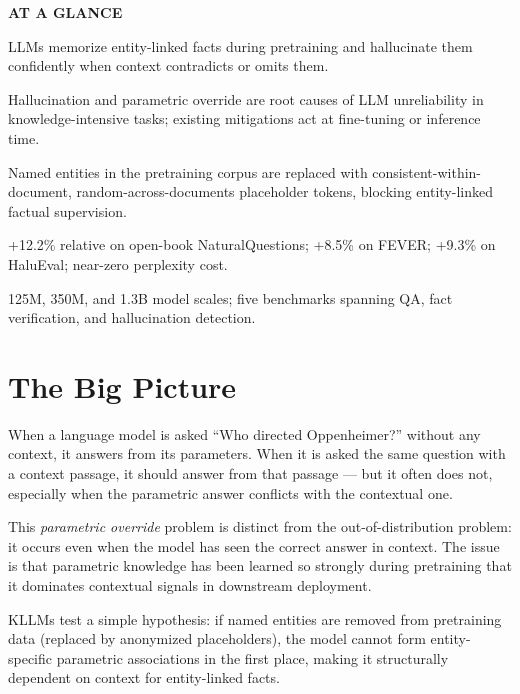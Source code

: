 \documentclass[10pt,twocolumn]{article}
\begin{document}
\begin{mdframed}[backgroundcolor=boxgray,linecolor=rulered,linewidth=1pt,
    innerleftmargin=6pt,innerrightmargin=6pt,
    innertopmargin=6pt,innerbottommargin=6pt]
\textbf{\small AT A GLANCE}\par\vspace{4pt}
\begin{description}[leftmargin=0pt,labelsep=4pt,itemsep=2pt,parsep=0pt,
    font=\small\bfseries]
  \item[Problem:] LLMs memorize entity-linked facts during pretraining
    and hallucinate them confidently when context contradicts or
    omits them.
  \item[Why it matters:] Hallucination and parametric override are
    root causes of LLM unreliability in knowledge-intensive tasks;
    existing mitigations act at fine-tuning or inference time.
  \item[Method:] Named entities in the pretraining corpus are replaced
    with consistent-within-document, random-across-documents
    placeholder tokens, blocking entity-linked factual supervision.
  \item[Result:] +12.2\% relative on open-book NaturalQuestions;
    +8.5\% on FEVER; +9.3\% on HaluEval; near-zero perplexity cost.
  \item[Evidence:] 125M, 350M, and 1.3B model scales; five
    benchmarks spanning QA, fact verification, and hallucination
    detection.
\end{description}
\end{mdframed}

\section{The Big Picture}

When a language model is asked ``Who directed Oppenheimer?'' without
any context, it answers from its parameters. When it is asked the
same question with a context passage, it should answer from that
passage --- but it often does not, especially when the parametric
answer conflicts with the contextual one.

This \emph{parametric override} problem is distinct from the
out-of-distribution problem: it occurs even when the model has seen
the correct answer in context. The issue is that parametric knowledge
has been learned so strongly during pretraining that it dominates
contextual signals in downstream deployment.

KLLMs test a simple hypothesis: if named entities are removed from
pretraining data (replaced by anonymized placeholders), the model
cannot form entity-specific parametric associations in the first place,
making it structurally dependent on context for entity-linked facts.
\end{document}
